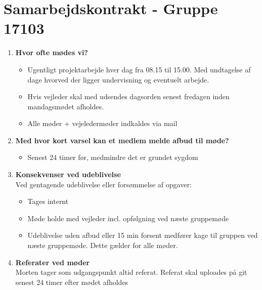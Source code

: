 

	\chapter*{Samarbejdskontrakt - Gruppe 17103}
	\begin{enumerate}
		\item \textbf{Hvor ofte mødes vi?}
			\begin{itemize}[-]
				\itemsep 0.3em
				\item Ugentligt projektarbejde hver dag fra 08.15 til 15.00. Med undtagelse af dage hvorved der ligger undervisning og eventuelt arbejde.
				\item Hvis vejleder skal med udsendes dagsorden senest fredagen inden mandagsmødet afholdes.
				\item Alle møder + vejeledermøder indkaldes via mail
				\vspace{1cm}				
			\end{itemize}
		\item \textbf{Med hvor kort varsel kan et medlem melde afbud til møde?}
			\begin{itemize}[-]
				\itemsep 0.3em
				\item Senest 24 timer før, medmindre det er grundet sygdom
				\vspace{1cm}
			\end{itemize}
			
		\item \textbf{Konsekvenser ved udeblivelse}\\
			Ved gentagende udeblivelse eller forsømmelse af opgaver:
			\begin{itemize}[-]
				\itemsep 0.3em
				\item Tages internt
				\item Møde holde med vejleder incl. opfølgning ved næste gruppemøde
				\item Udeblivelse uden afbud eller 15 min forsent medfører kage til gruppen ved næste gruppemøde. Dette gælder for alle møder.
				\vspace{1cm}
			\end{itemize}
		\item \textbf{Referater ved møder} \\
				Morten tager som udgangspunkt altid referat.
				Referat skal uploades på git senest 24 timer efter mødet afholdes
				\vspace{1cm}
			

\end{enumerate}
